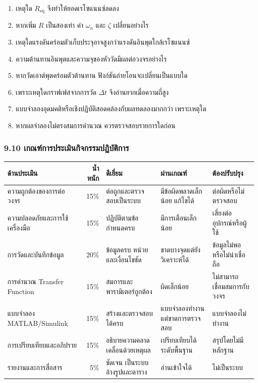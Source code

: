 \begin{enumerate}
    \item เหตุใด $R_{\text{eq}}$ จึงทำให้ยอดเรโซแนนซ์ลดลง
    \item หากเพิ่ม $R$ เป็นสองเท่า ค่า $\omega_n$ และ $\zeta$ เปลี่ยนอย่างไร
    \item เหตุใดแรงดันคร่อมตัวเก็บประจุอาจสูงกว่าแรงดันอินพุตใกล้เรโซแนนซ์
    \item ความต้านทานอินพุตและความจุของหัววัดมีผลต่อวงจรอย่างไร
    \item หากวัดเอาต์พุตคร่อมตัวต้านทาน ฟังก์ชันถ่ายโอนจะเปลี่ยนเป็นแบบใด
    \item เพราะเหตุใดกราฟเฟสจากการวัด $\Delta t$ จึงอ่านยากเมื่อความถี่สูง
    \item แบบจำลองอุดมคติหรือเชิงปฏิบัติสอดคล้องกับผลทดลองมากกว่า เพราะเหตุใด
    \item หากผลจำลองไม่ตรงสมการคำนวณ ควรตรวจสอบรายการใดก่อน
\end{enumerate}

\subsubsection{9.10 เกณฑ์การประเมินกิจกรรมปฏิบัติการ}

\begin{table}[htbp]
    \centering
    \begin{tabular}{l r l l l}
        \hline
        \textbf{ด้านประเมิน} & \textbf{น้ำหนัก} & \textbf{ดีเยี่ยม} & \textbf{ผ่านเกณฑ์} & \textbf{ต้องปรับปรุง} \\
        \hline
        ความถูกต้องของการต่อวงจร & 15\% & ต่อถูกและตรวจสอบเป็นระบบ & มีข้อผิดพลาดเล็กน้อย แก้ไขได้ & ต่อผิดหรือไม่ตรวจสอบ \\
        ความปลอดภัยและการใช้เครื่องมือ & 15\% & ปฏิบัติตามข้อกำหนดครบ & มีการเตือนเล็กน้อย & เสี่ยงต่ออุปกรณ์หรือผู้ใช้ \\
        การวัดและบันทึกข้อมูล & 20\% & ข้อมูลครบ หน่วยและเงื่อนไขชัด & ขาดบางจุดแต่ยังวิเคราะห์ได้ & ข้อมูลไม่พอหรือไม่น่าเชื่อถือ \\
        การคำนวณ Transfer Function & 15\% & สมการและพารามิเตอร์ถูกต้อง & ผิดเล็กน้อย & ไม่สามารถเชื่อมสมการกับวงจร \\
        แบบจำลอง MATLAB/Simulink & 15\% & สร้างและตรวจสอบได้ครบ & แบบจำลองทำงานแต่ขาดการตรวจสอบ & แบบจำลองไม่ทำงาน \\
        การเปรียบเทียบและอภิปราย & 15\% & อธิบายความคลาดเคลื่อนด้วยเหตุผล & เปรียบเทียบได้ระดับพื้นฐาน & สรุปโดยไม่มีหลักฐาน \\
        รายงานและการสื่อสาร & 5\% & ชัดเจน เป็นระบบ อ้างรูปและตาราง & อ่านเข้าใจได้ & ไม่เป็นระบบ \\
        \hline
    \end{tabular}
\end{table}

